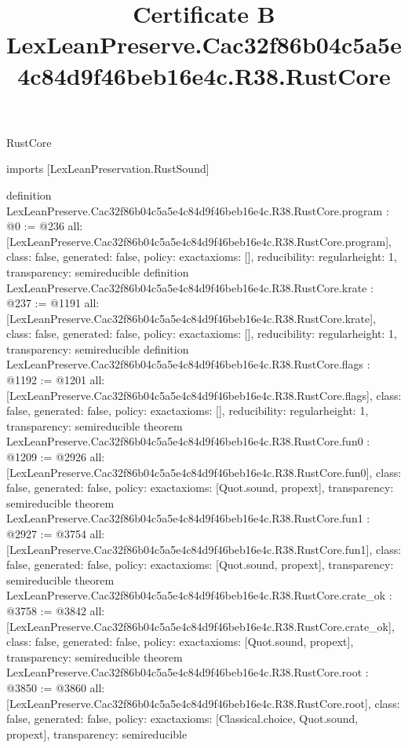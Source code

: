 \begin{lexlean}{RustCore}
\title{Certificate B LexLeanPreserve.Cac32f86b04c5a5e4c84d9f46beb16e4c.R38.RustCore}
\begin{coremodule}
imports [LexLeanPreservation.RustSound]

definition LexLeanPreserve.Cac32f86b04c5a5e4c84d9f46beb16e4c.R38.RustCore.program : @0 := @236 {
  all: [LexLeanPreserve.Cac32f86b04c5a5e4c84d9f46beb16e4c.R38.RustCore.program],
  class: false,
  generated: false,
  policy: exact{axioms: []},
  reducibility: regular{height: 1},
  transparency: semireducible
}
definition LexLeanPreserve.Cac32f86b04c5a5e4c84d9f46beb16e4c.R38.RustCore.krate : @237 := @1191 {
  all: [LexLeanPreserve.Cac32f86b04c5a5e4c84d9f46beb16e4c.R38.RustCore.krate],
  class: false,
  generated: false,
  policy: exact{axioms: []},
  reducibility: regular{height: 1},
  transparency: semireducible
}
definition LexLeanPreserve.Cac32f86b04c5a5e4c84d9f46beb16e4c.R38.RustCore.flags : @1192 := @1201 {
  all: [LexLeanPreserve.Cac32f86b04c5a5e4c84d9f46beb16e4c.R38.RustCore.flags],
  class: false,
  generated: false,
  policy: exact{axioms: []},
  reducibility: regular{height: 1},
  transparency: semireducible
}
theorem LexLeanPreserve.Cac32f86b04c5a5e4c84d9f46beb16e4c.R38.RustCore.fun0 : @1209 := @2926 {
  all: [LexLeanPreserve.Cac32f86b04c5a5e4c84d9f46beb16e4c.R38.RustCore.fun0],
  class: false,
  generated: false,
  policy: exact{axioms: [Quot.sound, propext]},
  transparency: semireducible
}
theorem LexLeanPreserve.Cac32f86b04c5a5e4c84d9f46beb16e4c.R38.RustCore.fun1 : @2927 := @3754 {
  all: [LexLeanPreserve.Cac32f86b04c5a5e4c84d9f46beb16e4c.R38.RustCore.fun1],
  class: false,
  generated: false,
  policy: exact{axioms: [Quot.sound, propext]},
  transparency: semireducible
}
theorem LexLeanPreserve.Cac32f86b04c5a5e4c84d9f46beb16e4c.R38.RustCore.crate_ok : @3758 := @3842 {
  all: [LexLeanPreserve.Cac32f86b04c5a5e4c84d9f46beb16e4c.R38.RustCore.crate_ok],
  class: false,
  generated: false,
  policy: exact{axioms: [Quot.sound, propext]},
  transparency: semireducible
}
theorem LexLeanPreserve.Cac32f86b04c5a5e4c84d9f46beb16e4c.R38.RustCore.root : @3850 := @3860 {
  all: [LexLeanPreserve.Cac32f86b04c5a5e4c84d9f46beb16e4c.R38.RustCore.root],
  class: false,
  generated: false,
  policy: exact{axioms: [Classical.choice, Quot.sound, propext]},
  transparency: semireducible
}


\end{coremodule}
\end{lexlean}

